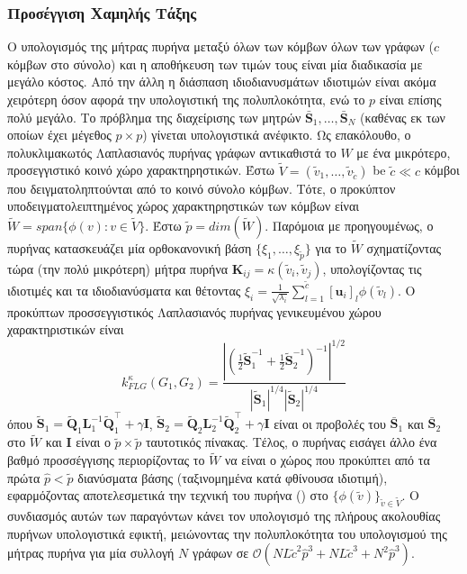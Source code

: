 \subsubsection{Προσέγγιση Χαμηλής Τάξης}
Ο υπολογισμός της μήτρας πυρήνα μεταξύ όλων των κόμβων όλων των γράφων ($c$ κόμβων στο σύνολο) και η αποθήκευση των τιμών τους είναι μία διαδικασία με μεγάλο κόστος.
Από την άλλη η διάσπαση ιδιοδιανυσμάτων ιδιοτιμών είναι ακόμα χειρότερη όσον αφορά την υπολογιστική της πολυπλοκότητα, ενώ το $p$ είναι επίσης πολύ μεγάλο.
Το πρόβλημα της διαχείρισης των μητρών $\bar{\mathbf{S}}_1, \ldots, \bar{\mathbf{S}}_N$ (καθένας εκ των οποίων έχει μέγεθος $p \times p$) γίνεται υπολογιστικά ανέφικτο.
Ως επακόλουθο, ο πολυκλιμακωτός Λαπλασιανός πυρήνας γράφων αντικαθιστά το $W$ με ένα μικρότερο, προσεγγιστικό κοινό χώρο χαρακτηρηστικών.
Έστω $\tilde{V} = (\tilde{v}_1, \ldots, \tilde{v}_{\tilde{c}})$ be $\tilde{c} \ll c$ κόμβοι που δειγματοληπτούνται από το κοινό σύνολο κόμβων.
Τότε, ο προκύπτον υποδειγματολειπτημένος χώρος χαρακτηρηστικών των κόμβων είναι $\tilde{W} = span \{ \phi(v) : v \in \tilde{V} \}$.
Έστω $\tilde{p} = dim(\tilde{W})$.
Παρόμοια με προηγουμένως, ο πυρήνας κατασκευάζει μία ορθοκανονική βάση $\{ \xi_1, \ldots, \xi_{\tilde{p}} \}$ για το $\tilde{W}$ σχηματίζοντας τώρα (την πολύ μικρότερη) μήτρα πυρήνα $\mathbf{K}_{ij} = \kappa(\tilde{v}_i, \tilde{v}_j)$, υπολογίζοντας τις ιδιοτιμές και τα ιδιοδιανύσματα και θέτοντας $\xi_i = \frac{1}{\sqrt{\lambda_i}} \sum_{l=1}^{\tilde{c}} [\mathbf{u}_i]_l \phi(\tilde{v}_l)$. 
Ο προκύπτων προσσεγγιστικός Λαπλασιανός πυρήνας γενικευμένου χώρου χαρακτηριστικών είναι
\begin{equation*}
    k_{FLG}^\kappa(G_1, G_2) = \frac{| (\frac{1}{2} \tilde{\mathbf{S}}_1^{-1} + \frac{1}{2} \tilde{\mathbf{S}}_2^{-1} )^{-1} |^{1/2}}{|\tilde{\mathbf{S}}_1|^{1/4} |\tilde{\mathbf{S}}_2|^{1/4}} 
\end{equation*}
όπου $\tilde{\mathbf{S}}_1 = \tilde{\mathbf{Q}}_1 \mathbf{L}_1^{-1} \tilde{\mathbf{Q}}_1^\top + \gamma \mathbf{I}$, $\tilde{\mathbf{S}}_2 = \tilde{\mathbf{Q}}_2 \mathbf{L}_2^{-1} \tilde{\mathbf{Q}}_2^\top + \gamma \mathbf{I}$ είναι οι προβολές του $\bar{\mathbf{S}}_1$ και $\bar{\mathbf{S}}_2$ στο $\tilde{W}$ και $\mathbf{I}$ είναι ο $\tilde{p} \times \tilde{p}$ ταυτοτικός πίνακας. Τέλος, ο πυρήνας εισάγει άλλο ένα βαθμό προσσέγγισης περιορίζοντας το $\tilde{W}$ να είναι ο χώρος που προκύπτει από τα πρώτα $\hat{p} < \tilde{p}$ διανύσματα βάσης (ταξινομημένα κατά φθίνουσα ιδιοτιμή), εφαρμόζοντας αποτελεσμετικά την τεχνική του  πυρήνα () στο $\{ \phi(\tilde{v}) \}_{\tilde{v} \in \tilde{V}}$.
Ο συνδιασμός αυτών των παραγόντων κάνει τον υπολογισμό της πλήρους ακολουθίας πυρήνων υπολογιστικά εφικτή, μειώνοντας την πολυπλοκότητα του υπολογισμού της μήτρας πυρήνα για μία συλλογή $N$ γράφων σε $\mathcal{O}(NL \tilde{c}^2 \hat{p}^3 + NL \tilde{c}^3 + N^2 \hat{p}^3)$.

